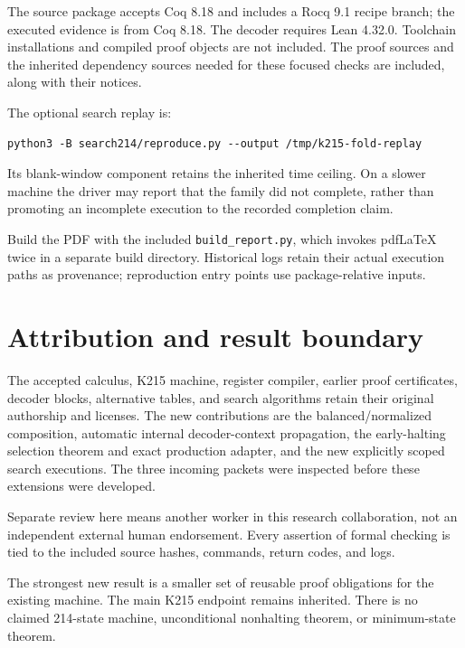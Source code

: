 \documentclass[11pt]{article}
\newcommand{\code}[1]{\texttt{#1}}
\theoremstyle{remark}
\begin{document}
The source package accepts Coq 8.18 and includes a Rocq 9.1 recipe branch;
the executed evidence is from Coq 8.18. The decoder requires Lean 4.32.0.
Toolchain installations and compiled proof objects are not included.
The proof sources and the inherited dependency sources needed for these
focused checks are included, along with their notices.

The optional search replay is:

\begin{lstlisting}
python3 -B search214/reproduce.py --output /tmp/k215-fold-replay
\end{lstlisting}

Its blank-window component retains the inherited time ceiling. On a slower
machine the driver may report that the family did not complete, rather
than promoting an incomplete execution to the recorded completion claim.

Build the PDF with the included \code{build\_report.py}, which invokes
pdfLaTeX twice in a separate build directory. Historical logs retain their
actual execution paths as provenance; reproduction entry points use
package-relative inputs.

\section*{Attribution and result boundary}

The accepted calculus, K215 machine, register compiler, earlier proof
certificates, decoder blocks, alternative tables, and search algorithms
retain their original authorship and licenses. The new contributions are
the balanced/normalized composition, automatic internal decoder-context
propagation, the early-halting selection theorem and exact production
adapter, and the new explicitly scoped search executions. The three
incoming packets were inspected before these extensions were developed.

Separate review here means another worker in this research collaboration,
not an independent external human endorsement. Every assertion of formal
checking is tied to the included source hashes, commands, return codes,
and logs.

The strongest new result is a smaller set of reusable proof obligations
for the existing machine. The main K215 endpoint remains inherited.
There is no claimed 214-state machine, unconditional nonhalting theorem,
or minimum-state theorem.
\end{document}
